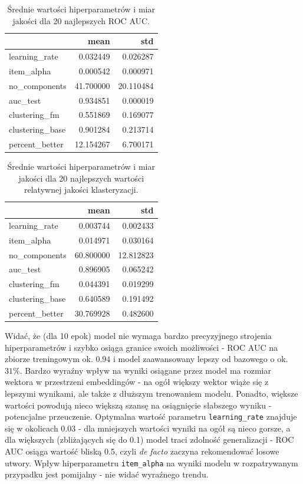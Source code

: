 \documentclass[10pt,a4paper]{article}
\begin{document}
\begin{center}
\begin{table}[H]
\centering
\begin{tabular}{lrr}
\toprule
 & mean & std \\
\midrule
learning\_rate & 0.032449 & 0.026287 \\
item\_alpha & 0.000542 & 0.000971 \\
no\_components & 41.700000 & 20.110484 \\
\hline
auc\_test & 0.934851 & 0.000019 \\
clustering\_fm & 0.551869 & 0.169077 \\
clustering\_base & 0.901284 & 0.213714 \\
percent\_better & 12.154267 & 6.700171 \\
\bottomrule
\end{tabular}
\caption{Średnie wartości hiperparametrów i miar jakości dla 20 najlepszych ROC AUC.}
\end{table}
\end{center}
\begin{center}
\begin{table}[H]
\centering
\begin{tabular}{lrr}
\toprule
 & mean & std \\
\midrule
learning\_rate & 0.003744 & 0.002433 \\
item\_alpha & 0.014971 & 0.030164 \\
no\_components & 60.800000 & 12.812823 \\
\hline
auc\_test & 0.896905 & 0.065242 \\
clustering\_fm & 0.044391 & 0.019299 \\
clustering\_base & 0.640589 & 0.191492 \\
percent\_better & 30.769928 & 0.482600 \\
\bottomrule
\end{tabular}
\caption{Średnie wartości hiperparametrów i miar jakości dla 20 najlepszych wartości relatywnej jakości klasteryzacji.}
\end{table}
    
\end{center}



Widać, że (dla 10 epok) model nie wymaga bardzo precyzyjnego strojenia hiperparametrów i szybko osiąga granice swoich możliwości - ROC AUC na zbiorze treningowym ok. $0.94$ i model zaawansowany lepszy od bazowego o ok. $31\%$. Bardzo wyraźny wpływ na wyniki osiągane przez model ma rozmiar wektora w przestrzeni embeddingów - na ogół większy wektor wiąże się z lepszymi wynikami, ale także z dłuższym trenowaniem modelu. Ponadto, większe wartości powodują nieco większą szansę na osiągnięcie słabszego wyniku - potencjalne przeuczenie. Optymalna wartość parametru \texttt{learning\_rate} znajduje się w okolicach $0.03$ - dla mniejszych wartości wyniki na ogół są nieco gorsze, a dla większych (zbliżających się do 0.1) model traci zdolność generalizacji - ROC AUC osiąga wartość bliską 0.5, czyli \textit{de facto} zaczyna rekomendować losowe utwory. Wpływ hiperparametru \texttt{item\_alpha} na wyniki modelu w rozpatrywanym przypadku jest pomijalny - nie widać wyraźnego trendu.
\end{document}
